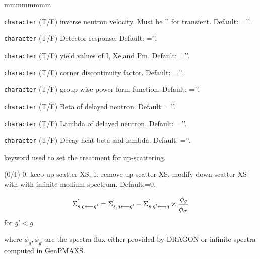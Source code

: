 \begin{ListeDeDescription}{mmmmmmmm}
\item[\dusa{linv}] \texttt{character} (T/F) inverse neutron velocity. Must be '' for transient. Default: =''. 

\item[\dusa{ldet}] \texttt{character} (T/F) Detector response. Default: =''.

\item[\dusa{lyld}] \texttt{character} (T/F) yield values of I, Xe,and Pm. Default: =''.

\item[\dusa{lcdf}] \texttt{character} (T/F) corner discontinuity factor. Default: =''.

\item[\dusa{lgff}] \texttt{character} (T/F) group wise power form function. Default: =''.

\item[\dusa{lbet}] \texttt{character} (T/F) Beta of delayed neutron. Default: =''.

\item[\dusa{lamb}] \texttt{character} (T/F) Lambda of delayed neutron. Default: =''.

\item[\dusa{ldec}] \texttt{character} (T/F) Decay heat beta and lambda. Default: =''.

\item[\moc{IUPS}]   keyword used to set the treatment for up-scattering.

\item[\dusa{iups}] (0/1) 0: keep up scatter XS, 1: remove up scatter XS, modify down scatter XS with with infinite medium spectrum. Default:=0.  

$$
\Sigma^{'}_{s,g \longleftarrow g'}=\Sigma^{'}_{s,g \longleftarrow g'}-\Sigma^{'}_{s,g' \longleftarrow g} \times {\phi _{g}\over\phi _{g'}}
$$
for $g'<g$

where $\phi _{g},\phi _{g'}$ are the spectra flux either provided by DRAGON or infinite spectra computed in GenPMAXS.


\end{ListeDeDescription}
